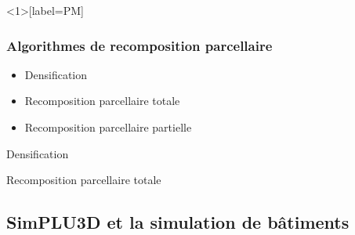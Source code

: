 \documentclass[xcolor=table]{beamer}
\begin{document}
\begin{frame}<1>[label=PM]
	\frametitle{Algorithmes de recomposition parcellaire}
	\begin{itemize}
		\item \alert<1>{Densification}
		\item \alert<2>{Recomposition parcellaire totale}
		\item \alert<2>{Recomposition parcellaire partielle}
	\end{itemize}
\end{frame}

\begin{frame}{Densification}
\end{frame}


\begin{frame}{Recomposition parcellaire totale}
\end{frame}


\subsection[SimPLU3D]{SimPLU3D et la simulation de bâtiments}
\begin{frame}
\subsectionpage
\end{frame}
\end{document}
